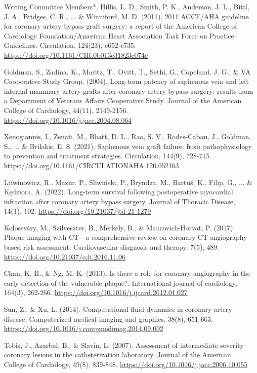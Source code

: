 ﻿\documentclass[12pt,a4paper]{article}
\theoremstyle{definition}
\numberwithin{equation}{section}
\begin{document}
\begin{thebibliography}{}
 Writing Committee Members*, Hillis, L. D., Smith, P. K., Anderson, J. L., Bittl, J. A., Bridges, C. R., ... \& Winniford, M. D. (2011). 2011 ACCF/AHA guideline for coronary artery bypass graft surgery: a report of the American College of Cardiology Foundation/American Heart Association Task Force on Practice Guidelines. Circulation, 124(23), e652-e735. \url{https://doi.org/10.1161/CIR.0b013e31823c074e}

 Goldman, S., Zadina, K., Moritz, T., Ovitt, T., Sethi, G., Copeland, J. G., \& VA Cooperative Study Group. (2004). Long-term patency of saphenous vein and left internal mammary artery grafts after coronary artery bypass surgery: results from a Department of Veterans Affairs Cooperative Study. Journal of the American College of Cardiology, 44(11), 2149-2156. \url{https://doi.org/10.1016/j.jacc.2004.08.064}

 Xenogiannis, I., Zenati, M., Bhatt, D. L., Rao, S. V., Rodes-Cabau, J., Goldman, S., ... \& Brilakis, E. S. (2021). Saphenous vein graft failure: from pathophysiology to prevention and treatment strategies. Circulation, 144(9), 728-745. \url{https://doi.org/10.1161/CIRCULATIONAHA.120.052163}

 Litwinowicz, R., Mazur, P., Śliwiński, P., Bryndza, M., Bartuś, K., Filip, G., ... \& Kędziora, A. (2022). Long-term survival following postoperative myocardial infraction after coronary artery bypass surgery. Journal of Thoracic Disease, 14(1), 102. \url{https://doi.org/10.21037/jtd-21-1279}

 Kolossváry, M., Szilveszter, B., Merkely, B., \& Maurovich-Horvat, P. (2017). Plaque imaging with CT—a comprehensive review on coronary CT angiography based risk assessment. Cardiovascular diagnosis and therapy, 7(5), 489. \url{https://doi.org/10.21037/cdt.2016.11.06}

 Chan, K. H., \& Ng, M. K. (2013). Is there a role for coronary angiography in the early detection of the vulnerable plaque?. International journal of cardiology, 164(3), 262-266. \url{https://doi.org/10.1016/j.ijcard.2012.01.027}

 Sun, Z., \& Xu, L. (2014). Computational fluid dynamics in coronary artery disease. Computerized medical imaging and graphics, 38(8), 651-663. \url{https://doi.org/10.1016/j.compmedimag.2014.09.002}

 Tobis, J., Azarbal, B., \& Slavin, L. (2007). Assessment of intermediate severity coronary lesions in the catheterization laboratory. Journal of the American College of Cardiology, 49(8), 839-848. \url{https://doi.org/10.1016/j.jacc.2006.10.055}


\end{thebibliography}
\end{document}
